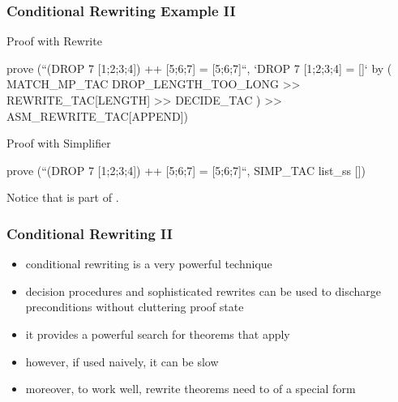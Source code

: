 \begin{frame}[fragile]
\frametitle{Conditional Rewriting Example II}

\begin{block}{Proof with Rewrite}
\begin{semiverbatim}\scriptsize
prove (``(DROP 7 [1;2;3;4]) ++ [5;6;7] = [5;6;7]``,
`DROP 7 [1;2;3;4] = []` by (
  MATCH_MP_TAC DROP_LENGTH_TOO_LONG >>
  REWRITE_TAC[LENGTH] >>
  DECIDE_TAC
) >>
ASM_REWRITE_TAC[APPEND])
\end{semiverbatim}
\end{block}

\begin{block}{Proof with Simplifier}
\begin{semiverbatim}\scriptsize
prove (``(DROP 7 [1;2;3;4]) ++ [5;6;7] = [5;6;7]``,
SIMP_TAC list_ss [])
\end{semiverbatim}
Notice that  is part of .
\end{block}
\end{frame}


\begin{frame}[fragile]
\frametitle{Conditional Rewriting II}

\begin{itemize}
\item conditional rewriting is a very powerful technique
\item decision procedures and sophisticated rewrites can be used to discharge preconditions without cluttering proof state
\item it provides a powerful search for theorems that apply
\item however, if used naively, it can be slow
\item moreover, to work well, rewrite theorems need to of a special form
\end{itemize}
\end{frame}


